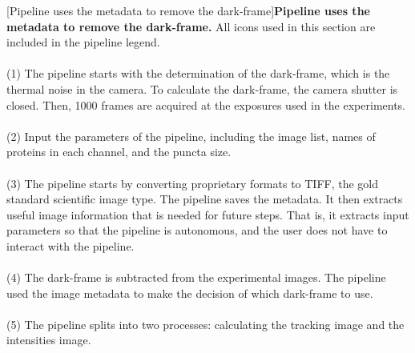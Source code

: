 \begin{centering}
[Pipeline uses the metadata to remove the dark-frame]{\textbf{Pipeline uses the metadata to remove the dark-frame.} All icons used in this section are included in the pipeline legend.
\\
\\
(1) The pipeline starts with the determination of the dark-frame, which is the thermal noise in the camera. To calculate the dark-frame, the camera shutter is closed. Then, 1000 frames are acquired at the exposures used in the experiments.
\\
\\
(2) Input the parameters of the pipeline, including the image list, names of proteins in each channel, and the puncta size.
\\
\\
(3) The pipeline starts by converting proprietary formats to TIFF, the gold standard scientific image type. The pipeline saves the metadata. It then extracts useful image information that is needed for future steps. That is, it extracts input parameters so that the pipeline is autonomous, and the user does not have to interact with the pipeline.
\\
\\
(4) The dark-frame is subtracted from the experimental images. The pipeline used the image metadata to make the decision of which dark-frame to use.
\\
\\
(5) The pipeline splits into two processes: calculating the tracking image and the intensities image.}
\label{m:1}
\end{centering}

